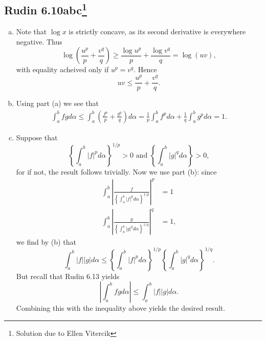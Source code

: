 \documentclass{../mathnotes}
\begin{document}
\subsection*{Rudin 6.10abc\footnote{Solution due to Ellen Vitercik}}
\begin{enumerate}[(a)]
    \item Note that $\log x$ is strictly concave, as its second derivative is
        everywhere negative. Thus
        \[\log\left( \frac{u^p}{p} + \frac{v^q}{q} \right)\geq \frac{\log u^p}{p}+\frac{\log v^q}{q}=\log (uv),\]
        with equality acheived only if $u^p=v^q$. Hence
        \[uv\leq \frac{u^p}{p}+\frac{v^q}{q}.\]
    \item Using part (a) we see that
        \begin{align*}
            \int_a^b fg d\alpha\leq\int_a^b\left(\frac{f^p}{p}+\frac{g^q}{q}  \right)d\alpha=\frac{1}{p}\int_a^b f^pd\alpha+\frac{1}{q}\int_a^bg^pd\alpha=1.
        \end{align*}
    \item Suppose that
        \[\left\{ \int_a^b|f|^pd\alpha \right\}^{1/p}>0\text{ and }\left\{ \int_a^b|g|^qd\alpha \right\}>0,\]
        for if not, the result follows trivially. Now we use part (b): since
        \begin{align*}
            \int_a^b\left|\frac{f}{ \left\{ \int_a^b|f|^pd\alpha \right\}^{1/p} }\right|^p&=1\\
            \int_a^b\left|\frac{g}{ \left\{ \int_a^b|g|^qd\alpha \right\}^{1/q} }\right|^q&=1,
        \end{align*}
        we find by (b) that
        \[\int_a^b|f||g|d\alpha\leq \left\{ \int_a^b|f|^pd\alpha \right\}^{1/p}\left\{ \int_a^b|g|^qd\alpha \right\}^{1/q}.\]
        But recall that Rudin 6.13 yields
        \[\left|\int_a^b fgd\alpha\right|\leq\int_a^b|f||g|d\alpha.\]
        Combining this with the inequality above yields the desired result.
\end{enumerate}
\end{document}
